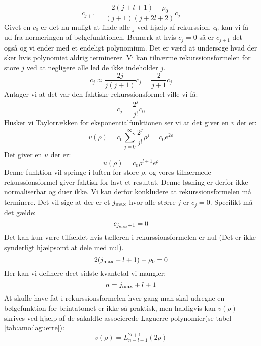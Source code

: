 \documentclass[../../Atom-ogMolekylefysik.tex]{subfiles}
\begin{document}
\begin{equation}
c_{j+1}=\frac{2(j+l+1)-\rho_0}{(j+1)(j+2l+2)}c_j
\end{equation}
Givet en $c_0$ er det nu muligt at finde alle $_j$ ved hjælp af rekurssion. $c_0$ kan vi få ud fra normeringen af bølgefunktionen. Bemærk at hvis $c_j=0$ så er $c_{j+1}$ det også og vi ender med et endeligt polynomium. Det er værd at undersøge hvad der sker hvis polynomiet aldrig terminerer. Vi kan tilnærme rekurssionsformelen for store $j$ ved at negligere alle led de ikke indeholder $j$.
$$
c_j\approx \frac{2j}{j(j+1)}c_j=\frac{2}{j+1}c_j
$$
Antager vi at det var den faktiske rekurssionsformel ville vi få:
$$
c_j=\frac{2^j}{j!}c_0
$$
Husker vi Taylorrækken for eksponentialfunktionen ser vi at det giver en $v$ der er:
$$
v(\rho) = c_0\sum_{j=0}^\infty \frac{2^j}{j!}\rho^j=c_0e^{2\rho}
$$
Det giver en $u$ der er:
$$
u(\rho)=c_0\rho^{l+1}e^{\rho}
$$
Denne funktion vil springe i luften for store $\rho$, og vores tilnærmede rekurssionsformel giver faktisk for lavt et resultat. Denne løsning er derfor ikke normaliserbar og duer ikke. Vi kan derfor konkludere at rekurssionsformelen må terminere. Det vil sige at der er et $j_{\text{max}}$ hvor alle større $j$ er $c_j=0$. Specifikt må det gælde:
\begin{equation}
    c_{j_{\text{max}}+1}=0
\end{equation}
Det kan kun være tilfældet hvis tælleren i rekurssionsformelen er nul (Det er ikke synderligt hjælpsomt at dele med nul). 
\begin{equation}
    2(j_{\text{max}}+l+1)-\rho_0=0
\end{equation}
Her kan vi definere dcet sidste kvantetal vi mangler:
\begin{equation}
    n=j_{\text{max}}+l+1
\end{equation}
At skulle have fat i rekurssionsformelen hver gang man skal udregne en bølgefunktion for brintatomet er ikke så praktisk, men haldigvis kan $v(\rho)$ skrives ved hjælp af de såkaldte associerede Laguerre polynomier(se tabel \ref{tab:amo:laguerre}):
\begin{equation}
    v(\rho)=L_{n-l-1}^{2l+1}(2\rho)
\end{equation}
\end{document}
